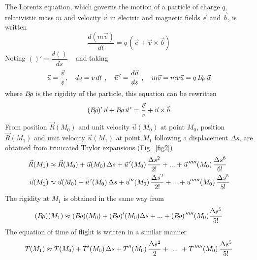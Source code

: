 The Lorentz equation, which governs the motion of a particle of charge $q$,  relativistic 
mass $m$ and velocity $\vec  v$ in electric and magnetic fields $\vec  e$ and $\vec  b$, is written 
%
\begin{equation}
\dfrac{d(m\vec  v)}{dt} = q\, (\vec  e + \vec  v \times  \vec  b)  \label{eq2-2-1}
\end{equation}
%
\noindent Noting $()' = \dfrac{d()}{ds} $ ~  and taking      
%
\begin{equation}
\vec  u = \dfrac{\vec  v }{v},\quad
    	ds = v\,dt \ ,\quad
		\vec  u^{\,\prime}  =\dfrac{d\vec  u }{ds} \ ,\quad
			 m\vec  v = mv\vec  u = q\, B\!\rho \, \vec  u \label{eq2-2-2}
\end{equation}
 where $ B\!\rho $ is the rigidity of the particle, this equation can be rewritten 
%
\begin{equation}
(B\!\rho )^\prime \, \vec  u +B\!\rho \,\vec  u^{\,\prime}  
	=  \dfrac{\vec  e }{v}  + \vec  u  \times   \vec  b   \label{eq2-2-3}
\end{equation}
%
\noindent From position $ \vec  R(M_0) $ and unit velocity $ \vec  u(M_0) $ at
point $ M_0 $, position $ \vec  R(M_1) $ and unit velocity $ \vec  u(M_1) $ 
at point $ M_1 $ following a 
displacement  $ \Delta s $, are obtained from truncated Taylor expansions (Fig.~\ref{fig2})  
%
\begin{equation}
\begin{aligned}
\vec  R(M_1)  &  \approx  \vec  R(M_0) + \vec  u(M_0)\, \Delta s+ \vec  u^{\,\prime} (M_0)\,
	\dfrac{\Delta s^2 }{2!}  +  ...+ \vec  u^{\,\prime\prime\prime\prime\prime} (M_0)\,
	\dfrac{\Delta s^6 }{6!} \\
\vec  u(M_1) & \approx  \vec u(M_0)  + \vec  u^{\,\prime} (M_0)\,\Delta s  + \vec  u^{\,\prime\prime} (M_0)\,
	\dfrac{\Delta s^2 }{2!}  +   ...+ \vec  u^{\,\prime\prime\prime\prime\prime} (M_0)\,
	\dfrac{\Delta s^5 }{5!} 
\end{aligned}\label{eq2-2-4}
\end{equation}
%
\noindent The rigidity at $ M_1 $ is obtained in the same way from
\begin{equation}
 (B\!\rho )(M_1) \approx (B\!\rho )(M_0)+(B\!\rho )^\prime (M_0)\Delta s+...+
	(B\!\rho)^{\,\prime\prime\prime\prime\prime} (M_0) \dfrac{\Delta s^5 }{5!}   	\label{eq2-2-5}
\end{equation}
%
\noindent The equation of time of flight is written in a similar manner 
\begin{equation}
 T(M_1) \approx   T(M_0) +  T' (M_0)\, \Delta s+ T'' (M_0)\,\dfrac{\Delta s^2}{2} + 
    ~ ... ~  + T^{\,\prime\prime\prime\prime\prime} (M_0)\,\dfrac{\Delta s^5}{5!} 	\label{eq2-2-Time}
\end{equation}


